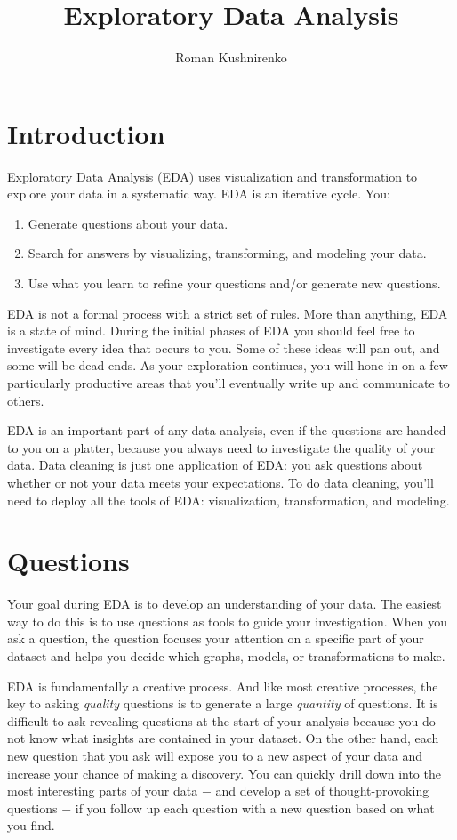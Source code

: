 \documentclass{article}
\title{Exploratory Data Analysis}
\author{Roman Kushnirenko}
\begin{document}
	\maketitle

	\section{Introduction}

Exploratory Data Analysis (EDA) uses visualization and transformation to explore your data in a systematic way. EDA is an iterative cycle. You:

\begin{enumerate}
  \item Generate questions about your data.
  \item Search for answers by visualizing, transforming, and modeling your data.
  \item Use what you learn to refine your questions and/or generate new questions.
\end{enumerate}

EDA is not a formal process with a strict set of rules. More than anything, EDA is a state of mind. During the initial phases of EDA you should feel free to investigate every idea that occurs to you. Some of these ideas will pan out, and some will be dead ends. As your exploration continues, you will hone in on a few particularly productive areas that you’ll eventually write up and communicate to others.

EDA is an important part of any data analysis, even if the questions are handed to you on a platter, because you always need to investigate the quality of your data. Data cleaning is just one application of EDA: you ask questions about whether or not your data meets your expectations. To do data cleaning, you’ll need to deploy all the tools of EDA: visualization, transformation, and modeling.

	\section{Questions}

Your goal during EDA is to develop an understanding of your data. The easiest way to do this is to use questions as tools to guide your investigation. When you ask a question, the question focuses your attention on a specific part of your dataset and helps you decide which graphs, models, or transformations to make.

EDA is fundamentally a creative process. And like most creative processes, the key to asking \textit{quality} questions is to generate a large \textit{quantity} of questions. It is difficult to ask revealing questions at the start of your analysis because you do not know what insights are contained in your dataset. On the other hand, each new question that you ask will expose you to a new aspect of your data and
increase your chance of making a discovery. You can quickly drill down into the most interesting parts of your data \(-\) and develop a set of thought-provoking questions \(-\) if you follow up each question with a new question based on what you find.
\end{document}

